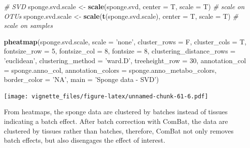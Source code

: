 \documentclass[]{book}
\newenvironment{Shaded}{\begin{snugshade}}{\end{snugshade}}
\newcommand{\KeywordTok}[1]{\textcolor[rgb]{0.13,0.29,0.53}{\textbf{#1}}}
\newcommand{\DataTypeTok}[1]{\textcolor[rgb]{0.13,0.29,0.53}{#1}}
\newcommand{\DecValTok}[1]{\textcolor[rgb]{0.00,0.00,0.81}{#1}}
\newcommand{\StringTok}[1]{\textcolor[rgb]{0.31,0.60,0.02}{#1}}
\newcommand{\CommentTok}[1]{\textcolor[rgb]{0.56,0.35,0.01}{\textit{#1}}}
\newcommand{\NormalTok}[1]{#1}
\begin{document}
\begin{Shaded}
\begin{Highlighting}[]
\CommentTok{# SVD}
\NormalTok{sponge.svd.scale <-}\StringTok{ }\KeywordTok{scale}\NormalTok{(sponge.svd, }\DataTypeTok{center =}\NormalTok{ T, }\DataTypeTok{scale =}\NormalTok{ T) }
\CommentTok{# scale on OTUs}
\NormalTok{sponge.svd.scale <-}\StringTok{ }\KeywordTok{scale}\NormalTok{(}\KeywordTok{t}\NormalTok{(sponge.svd.scale), }\DataTypeTok{center =}\NormalTok{ T, }\DataTypeTok{scale =}\NormalTok{ T) }
\CommentTok{# scale on samples}

\KeywordTok{pheatmap}\NormalTok{(sponge.svd.scale, }
         \DataTypeTok{scale =} \StringTok{'none'}\NormalTok{, }
         \DataTypeTok{cluster_rows =}\NormalTok{ F, }
         \DataTypeTok{cluster_cols =}\NormalTok{ T, }
         \DataTypeTok{fontsize_row =} \DecValTok{5}\NormalTok{, }\DataTypeTok{fontsize_col =} \DecValTok{8}\NormalTok{,}
         \DataTypeTok{fontsize =} \DecValTok{8}\NormalTok{,}
         \DataTypeTok{clustering_distance_rows =} \StringTok{'euclidean'}\NormalTok{,}
         \DataTypeTok{clustering_method =} \StringTok{'ward.D'}\NormalTok{,}
         \DataTypeTok{treeheight_row =} \DecValTok{30}\NormalTok{,}
         \DataTypeTok{annotation_col =}\NormalTok{ sponge.anno_col,}
         \DataTypeTok{annotation_colors =}\NormalTok{ sponge.anno_metabo_colors,}
         \DataTypeTok{border_color =} \StringTok{'NA'}\NormalTok{,}
         \DataTypeTok{main =} \StringTok{'Sponge data - SVD'}\NormalTok{)}
\end{Highlighting}
\end{Shaded}

\texttt{[image: vignette\_files/figure-latex/unnamed-chunk-61-6.pdf]}

From heatmaps, the sponge data are clustered by batches instead of
tissues indicating a batch effect. After batch correction with ComBat,
the data are clustered by tissues rather than batches, therefore, ComBat
not only removes batch effects, but also disengages the effect of
interest.
\end{document}
